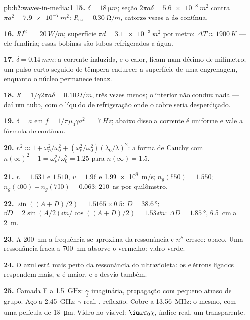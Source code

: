 \begin{solution}{pb:b2:waves-in-media:1}
\textbf{15.} $\delta = \qty{18}{\micro m}$; seção $2\pi a\delta = \qty{5.6e-8}{m^2}$ contra
$\pi a^2 = \qty{7.9e-7}{m^2}$: $R_{\text{ca}} = \qty{0.30}{\ohm/m}$, catorze vezes a de contínua.

\textbf{16.} $RI^2 = \qty{120}{W/m}$; superfície $\pi d = \qty{3.1e-3}{m^2}$ por metro:
$\Delta T \approx \qty{1900}{K}$ --- ele fundiria; essas bobinas são tubos refrigerados a água.

\textbf{17.} $\delta = \qty{0.14}{mm}$: a corrente induzida, e o calor, ficam
num décimo de milímetro; um pulso curto seguido de têmpera endurece
a superfície de uma engrenagem, enquanto o núcleo permanece tenaz.

\textbf{18.} $R = 1/\gamma2\pi a\delta = \qty{0.10}{\ohm/m}$, três vezes menos; o
interior não conduz nada --- daí um tubo, com o líquido de refrigeração onde o
cobre seria desperdiçado.

\textbf{19.} $\delta = a$ em $f = 1/\pi\mu_0\gamma a^2 = \qty{17}{Hz}$; abaixo disso a corrente é
uniforme e vale a fórmula de contínua.

\textbf{20.} $n^2 \approx 1 + \omega_p^2/\omega_0^2 + (\omega_p^2/\omega_0^2)(\lambda_0/\lambda)^2$: a forma de Cauchy
com $n(\infty)^2 - 1 = \omega_p^2/\omega_0^2 = 1.25$ para $n(\infty) = 1.5$.

\textbf{21.} $n = 1.531$ e $1.510$, $v = 1.96$ e \qty{1.99e8}{m/s}; $n_g(550) =
1.550$; $n_g(400) - n_g(700) = 0.063$: \qty{210}{ns} por quilômetro.

\textbf{22.} $\sin((A + D)/2) = 1.5165 \times 0.5$: $D = \qty{38.6}{\degree}$; $\dd D = 2\sin
(A/2)\dd n/\cos((A + D)/2) = 1.53\,\dd n$: $\Delta D = \qty{1.85}{\degree}$, \qty{6.5}{cm} a \qty{2}{m}.

\textbf{23.} A \qty{200}{nm} a frequência se aproxima da ressonância e
$n''$ cresce: opaco. Uma ressonância fraca a \qty{700}{nm} absorve o vermelho:
vidro verde.

\textbf{24.} O azul está mais perto da ressonância do ultravioleta: os elétrons
ligados respondem mais, $n$ é maior, e o desvio também.

\textbf{25.} Camada F a \qty{1.5}{GHz}: $\underline\gamma$ imaginária, propagação
com pequeno atraso de grupo. Aço a \qty{2.45}{GHz}: $\underline\gamma$ real, , reflexão. Cobre a \qty{13.56}{MHz}: o mesmo, com uma película de
\qty{18}{\micro m}. Vidro no visível: $\iu\omega\varepsilon_0\chi$, índice real, um
 transparente.
\end{solution}
